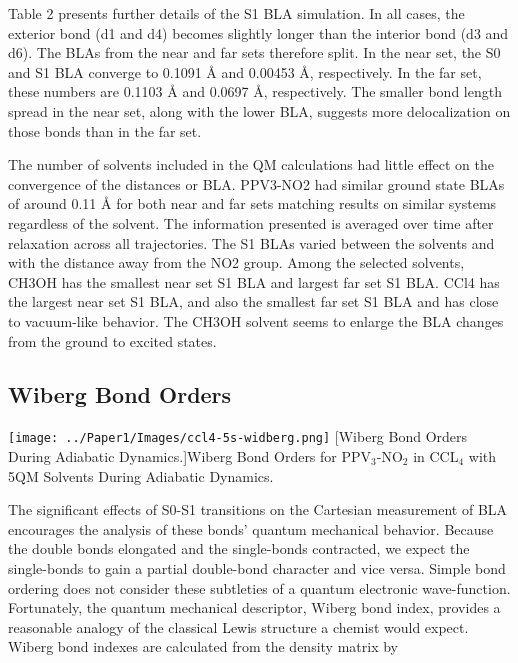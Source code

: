 	Table 2 presents further details of the S1 BLA simulation.
	In all cases, the exterior bond (d1 and d4) becomes slightly longer than the interior bond (d3 and d6).
	The BLAs from the near and far sets therefore split.
	In the near set, the S0 and S1 BLA converge to 0.1091 Å and 0.00453 Å, respectively.
	In the far set, these numbers are 0.1103 Å and 0.0697 Å, respectively.
	The smaller bond length spread in the near set, along with the lower BLA, suggests more delocalization on those bonds than in the far set. 

	The number of solvents included in the QM calculations had little effect on the convergence of the distances or BLA.
	PPV3-NO2 had similar ground state BLAs of around 0.11 Å for both near and far sets matching results on similar systems regardless of the solvent. \cite{nelson2011nonadiabatic}
	The information presented is averaged over time after relaxation across all trajectories.
	The S1 BLAs varied between the solvents and with the distance away from the NO2 group.
	Among the selected solvents, CH3OH has the smallest near set S1 BLA and largest far set S1 BLA.
	CCl4 has the largest near set S1 BLA, and also the smallest far set S1 BLA and has close to vacuum-like behavior.
	The CH3OH solvent seems to enlarge the BLA changes from the ground to excited states.

\subsection{Wiberg Bond Orders}
\begin{minipage}[c]{\textwidth}
\centering
\texttt{[image: ../Paper1/Images/ccl4-5s-widberg.png]}
[Wiberg Bond Orders During Adiabatic Dynamics.]{Wiberg Bond Orders for PPV\(_3\)-NO\(_2\) in CCL\(_4\) with 5QM Solvents During Adiabatic Dynamics. }
\label{fig:bondOrdersAdiabatic}
\end{minipage}\bigskip


    The significant effects of S0-S1 transitions on the Cartesian measurement of BLA encourages the analysis of these bonds' quantum mechanical behavior.
    Because the double bonds elongated and the single-bonds contracted, we expect the single-bonds to gain a partial double-bond character and vice versa.
    Simple bond ordering does not consider these subtleties of a quantum electronic wave-function.
    Fortunately, the quantum mechanical descriptor, Wiberg bond index, provides a reasonable analogy of the classical Lewis structure a chemist would expect.
    Wiberg bond indexes are calculated from the density matrix by 

